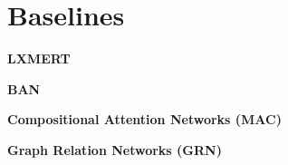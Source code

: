 \section{Baselines}

\textbf{LXMERT \cite{tan2019lxmert}}


\textbf{BAN \cite{kim2018bilinear}}

\textbf{Compositional Attention Networks (MAC) \cite{hudson2018compositional}}

\textbf{Graph Relation Networks (GRN) \cite{guo2019bilinear}}

